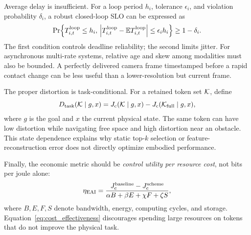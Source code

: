 \documentclass[letterpaper,journal]{IEEEtran}
\begin{document}
Average delay is insufficient. For a loop period $h_i$, tolerance
$\epsilon_i$, and violation probability $\delta_i$, a robust closed-loop SLO
can be expressed as
\begin{equation}
\Pr\!\left\{T_{i,t}^{\rm loop}\le h_i,\,
\left|T_{i,t}^{\rm loop}-\mathbb{E}T_{i,t}^{\rm loop}\right|
\le\epsilon_i h_i\right\}\ge 1-\delta_i.
\label{eq:robust_slo}
\end{equation}
The first condition controls deadline reliability; the second limits jitter.
For asynchronous multi-rate systems, relative age and skew among modalities
must also be bounded. A perfectly delivered camera frame timestamped before a
rapid contact change can be less useful than a lower-resolution but current
frame.

The proper distortion is task-conditional. For a retained token set
${\cal K}$, define
\begin{equation}
D_{\rm task}({\cal K}\mid g,x)
=J_{\rm c}({\cal K}\mid g,x)-J_{\rm c}({\cal K}_{\rm full}\mid g,x),
\label{eq:task_distortion}
\end{equation}
where $g$ is the goal and $x$ the current physical state. The same token can
have low distortion while navigating free space and high distortion near an
obstacle. This state dependence explains why static top-$k$ selection or
feature-reconstruction error does not directly optimize embodied performance.

Finally, the economic metric should be \emph{control utility per resource
cost}, not bits per joule alone:
\begin{equation}
\eta_{\rm EAI}=
\frac{J_{\rm c}^{\rm baseline}-J_{\rm c}^{\rm scheme}}
{\alpha B+\beta E+\chi F+\zeta S},
\label{eq:cost_effectiveness}
\end{equation}
where $B,E,F,S$ denote bandwidth, energy, computing cycles, and storage.
Equation~\eqref{eq:cost_effectiveness} discourages spending large resources on
tokens that do not improve the physical task.
\end{document}
